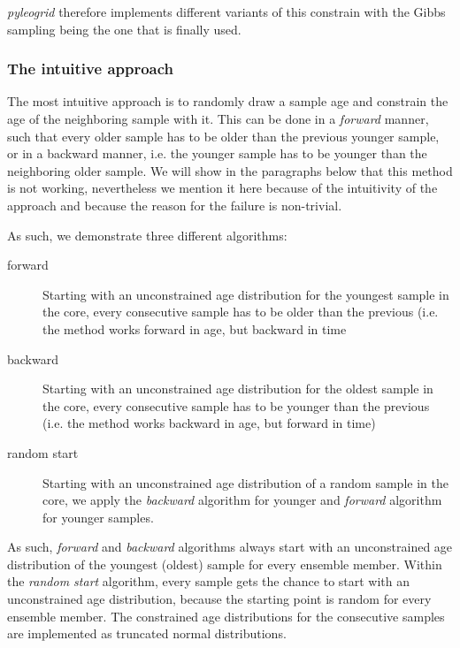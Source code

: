 \begin{refsection}
\textit{pyleogrid} therefore implements different variants of this constrain with the Gibbs sampling being the one that is finally used.

\subsubsection{The intuitive approach}
The most intuitive approach is to randomly draw a sample age and constrain the age of the neighboring sample with it. This can be done in a \textit{forward} manner, such that every older sample has to be older than the previous younger sample, or in a backward manner, i.e. the younger sample has to be younger than the neighboring older sample. We will show in the paragraphs below that this method is not working, nevertheless we mention it here because of the intuitivity of the approach and because the reason for the failure is non-trivial.

As such, we demonstrate three different algorithms:

\begin{description}
	\item[forward] Starting with an unconstrained age distribution for the youngest sample in the core, every consecutive sample has to be older than the previous (i.e. the method works forward in age, but backward in time
	\item[backward] Starting with an unconstrained age distribution for the oldest sample in the core, every consecutive sample has to be younger than the previous (i.e. the method works backward in age, but forward in time)
	\item[random start] Starting with an unconstrained age distribution of a random sample in the core, we apply the \textit{backward} algorithm for younger and \textit{forward} algorithm for younger samples.
\end{description}

As such, \textit{forward} and \textit{backward} algorithms always start with an unconstrained age distribution of the youngest (oldest) sample for every ensemble member. Within the \textit{random start} algorithm, every sample gets the chance to start with an unconstrained age distribution, because the starting point is random for every ensemble member. The constrained age distributions for the consecutive samples are implemented as truncated normal distributions.


\end{refsection}
